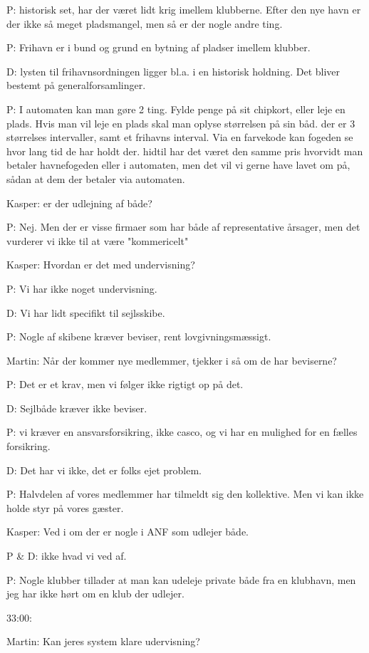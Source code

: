 P: historisk set, har der været lidt krig imellem klubberne. Efter den nye havn er der ikke så meget pladsmangel, men så er der nogle andre ting.


P: Frihavn er i bund og grund en bytning af pladser imellem klubber.


D: lysten til frihavnsordningen ligger bl.a. i en historisk holdning. Det bliver bestemt på generalforsamlinger.


P: I automaten kan man gøre 2 ting. Fylde penge på sit chipkort, eller leje en plads. Hvis man vil leje en plads skal man oplyse størrelsen på sin båd. der er 3 størrelses intervaller, samt et frihavns interval. Via en farvekode kan fogeden se hvor lang tid de har holdt der. hidtil har det været den samme pris hvorvidt man betaler havnefogeden eller i automaten, men det vil vi gerne have lavet om på, sådan at dem der betaler via automaten.


Kasper: er der udlejning af både?

P: Nej. Men der er visse firmaer som har både af representative årsager, men det vurderer vi ikke til at være "kommericelt"


Kasper: Hvordan er det med undervisning?

P: Vi har ikke noget undervisning.

D: Vi har lidt specifikt til sejlsskibe.

P: Nogle af skibene kræver beviser, rent lovgivningsmæssigt. 

Martin: Når der kommer nye medlemmer, tjekker i så om de har beviserne?

P: Det er et krav, men vi følger ikke rigtigt op på det.

D: Sejlbåde kræver ikke beviser.

P: vi kræver en ansvarsforsikring, ikke casco, og vi har en mulighed for en fælles forsikring.

D: Det har vi ikke, det er folks ejet problem.

P: Halvdelen af vores medlemmer har tilmeldt sig den kollektive. Men vi kan ikke holde styr på vores gæster.

Kasper: Ved i om der er nogle i ANF som udlejer både.

P \& D: ikke hvad vi ved af.

P: Nogle klubber tillader at man kan udeleje private både fra en klubhavn, men jeg har ikke hørt om en klub der udlejer.

33:00:


Martin: Kan jeres system klare udervisning?

